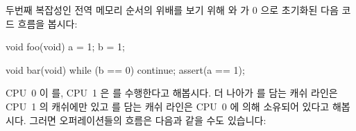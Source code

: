 두번째 복잡성인 전역 메모리 순서의 위배를 보기 위해  와  가 0
으로 초기화된 다음 코드 흐름을 봅시다:

\iffalse

To see the second complication, a violation of global memory ordering,
consider the following code sequences
with variables \qco{a} and \qco{b} initially zero:

\fi

\begin{VerbatimN}[fontsize=\footnotesize,samepage=true]
void foo(void)
{
	a = 1;
	b = 1;
}

void bar(void)
{
	while (b == 0) continue;
	assert(a == 1);
}
\end{VerbatimN}

CPU~0 이  를, CPU~1 은  를 수행한다고 해봅시다.
더 나아가  를 담는 캐쉬 라인은 CPU~1 의 캐쉬에만 있고  를 담는
캐쉬 라인은 CPU~0 에 의해 소유되어 있다고 해봅시다.
그러면 오퍼레이션들의 흐름은 다음과 같을 수도 있습니다:

\iffalse

Suppose CPU~0 executes \co{foo()} and CPU~1 executes \co{bar()}.
Suppose further that the cache line containing \qco{a} resides only in CPU~1's
cache, and that the cache line containing \qco{b} is owned by CPU~0.
Then the sequence of operations might be as follows:

\fi

